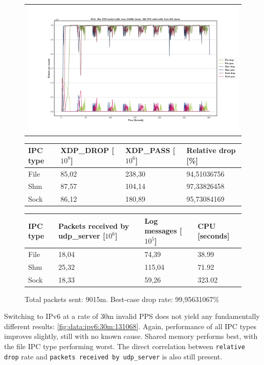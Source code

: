 \begin{figure}[!h]
	\centering
	\scriptsize
	\begin{tabular}{c}
    	\centerline{\includegraphics[width=1.2\textwidth]{images/IPv4_30m_131068_2.png}}
	\end{tabular}
	\begin{tabular}{llll}
		\toprule
		\textbf{IPC type} & \textbf{XDP\_DROP [$10^8$]} & \textbf{XDP\_PASS [$10^6$]} & \textbf{Relative drop [\%]} \\ \midrule 
		File & 85,02 & 238,30 & 94,51036756 \\
        Shm & 87,57 & 104,14 & 97,33826458 \\
        Sock & 86,12 & 180,89 & 95,73084169 \\
	\bottomrule
	\end{tabular}
    \begin{tabular}{llll}
		\toprule
		\textbf{IPC type} & \textbf{Packets received by udp\_server [$10^6$]} & \textbf{Log messages [$10^5$]} & \textbf{CPU [seconds]} \\ \midrule 
		File & 18,04 & 74,39 & 38.99 \\
        Shm & 25,32 & 115,04 & 71.92 \\
        Sock & 18,33 & 59,26 & 323.02 \\
	\bottomrule
	\end{tabular}
	\caption[Simplefail2ban, IPv4, 30m \ac{PPS}, 131068 malicious clients]{Total packets sent: 9015m. Best-case drop rate: 99,95631067\%}
	\label{fig:data:ipv4:30m:131068}
\end{figure}

Switching to IPv6 at a rate of 30m invalid \ac{PPS} does not yield any fundamentally different results: \ref{fig:data:ipv6:30m:131068}.
Again, performance of all \ac{IPC} types improves slightly, still with no known cause.
Shared memory performs best, with the file \ac{IPC} type performing worst.
The direct correlation between \texttt{relative drop} rate and \texttt{packets received by udp\_server} is also still present.

